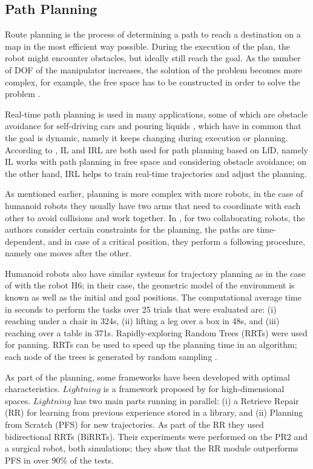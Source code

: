 \documentclass[thesis]{mas_proposal}
\begin{document}
	\subsection{Path Planning}
		
		Route planning is the process of determining a path to reach a destination on a map in the most efficient way possible. During the execution of the plan, the robot might encounter obstacles, but ideally still reach the goal. As the number of DOF of the manipulator increases, the solution of the problem becomes more complex, for example, the free space has to be constructed in order to solve the problem \cite{Siegwart2011}. 
		
		Real-time path planning is used in many applications, some of which are obstacle avoidance for self-driving cars \cite{Chaocheng2015} and pouring liquids \cite{Yamaguchi2015}, which have in common that the goal is dynamic, namely it keeps changing during execution or planning. According to \cite{Xie2020}, IL and IRL are both used for path planning based on LfD, namely IL works with path planning in free space and considering obstacle avoidance; on the other hand, IRL helps to train real-time trajectories and adjust the planning. 
		
		As mentioned earlier, planning is more complex with more robots, in the case of humanoid robots they usually have two arms that need to coordinate with each other to avoid collisions and work together. In \cite{Pecora2018}, for two collaborating robots, the authors consider certain constraints for the planning, the paths are time-dependent, and in case of a critical position, they perform a following procedure, namely one moves after the other.
		
		Humanoid robots also have similar systems for trajectory planning as in the case of \cite{Kuffner2001} with the robot H6; in their case, the geometric model of the environment is known as well as the initial and goal positions. The computational average time in seconds to perform the tasks over 25 trials that were evaluated are: (i) reaching under a chair in 324s, (ii) lifting a leg over a box in 48s, and (iii) reaching over a table in 371s. Rapidly-exploring Random Trees (RRTs) were used for panning. RRTs can be used to speed up the planning time in an algorithm; each node of the trees is generated by random sampling \cite{Veras2019}.
		
		As part of the planning, some frameworks have been developed with optimal characteristics. $Lightning$ is a framework proposed by \cite{Berenson2012} for high-dimensional spaces. $Lightning$ has two main parts running in parallel: (i) a Retrieve Repair (RR) for learning from previous experience stored in a library, and (ii) Planning from Scratch (PFS) for new trajectories. As part of the RR they used bidirectional RRTs (BiRRTs). Their experiments were performed on the PR2 and a surgical robot, both simulations; they show that the RR module outperforms PFS in over 90\% of the tests.
		
\end{document}
